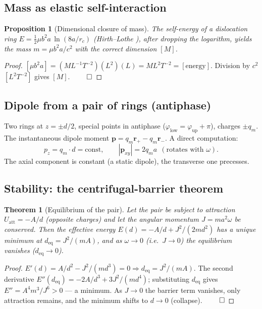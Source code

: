 \documentclass[12pt,a4paper]{article}
\newtheorem{theorem}{Theorem}
\newtheorem{proposition}{Proposition}
\begin{document}
\subsection{Mass as elastic self-interaction}
\begin{proposition}[Dimensional closure of mass]
The self-energy of a dislocation ring $E=\tfrac12\mu b^2 a\,\ln(8a/r_c)$
(Hirth--Lothe \cite{hirth1982}), after dropping the logarithm, yields the mass
$m=\mu b^2 a/c^2$ with the correct dimension $[M]$.
\end{proposition}
\begin{proof}
$[\mu b^2 a]=(ML^{-1}T^{-2})(L^2)(L)=ML^{2}T^{-2}=[\text{energy}]$. Division by
$c^2$ $[L^2T^{-2}]$ gives $[M]$. $\qed$
\end{proof}

\subsection{Dipole from a pair of rings (antiphase)}
Two rings at $z=\pm d/2$, special points in antiphase
($\varphi_{\text{low}}=\varphi_{\text{up}}+\pi$), charges $\pm q_m$. The
instantaneous dipole moment $\mathbf{p}=q_m\mathbf{r}_+ - q_m\mathbf{r}_-$.
A direct computation:
\begin{equation}
p_z = q_m\cdot d = \text{const},\qquad
|\mathbf{p}_{xy}| = 2 q_m a\ \ (\text{rotates with }\omega).
\end{equation}
The axial component is constant (a static dipole), the transverse one precesses.

\subsection{Stability: the centrifugal-barrier theorem}
\begin{theorem}[Equilibrium of the pair]
\label{th:stab}
Let the pair be subject to attraction $U_{\text{att}}=-A/d$ (opposite charges)
and let the angular momentum $J=m a^2\omega$ be conserved. Then the effective
energy $E(d)=-A/d+J^2/(2md^2)$ has a unique minimum at
$d_{\text{eq}}=J^2/(mA)$, and as $\omega\to0$ (i.e.\ $J\to0$) the equilibrium
vanishes ($d_{\text{eq}}\to0$).
\end{theorem}
\begin{proof}
$E'(d)=A/d^2-J^2/(md^3)=0 \Rightarrow d_{\text{eq}}=J^2/(mA)$. The second
derivative $E''(d_{\text{eq}})=-2A/d^3+3J^2/(md^4)$; substituting $d_{\text{eq}}$
gives $E''=A^4 m^3/J^6>0$ --- a minimum. As $J\to0$ the barrier term vanishes,
only attraction remains, and the minimum shifts to $d\to0$ (collapse). $\qed$
\end{proof}
\end{document}
